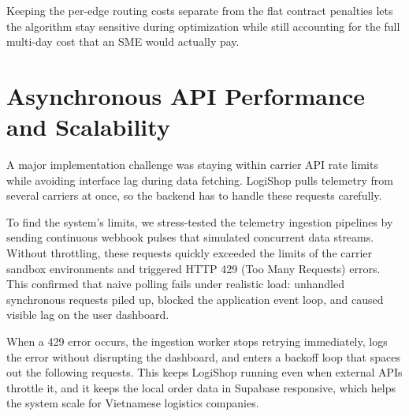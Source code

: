 Keeping the per-edge routing costs separate from the flat contract penalties lets the algorithm stay sensitive during optimization while still accounting for the full multi-day cost that an SME would actually pay.

\section{Asynchronous API Performance and Scalability}

A major implementation challenge was staying within carrier API rate limits while avoiding interface lag during data fetching. LogiShop pulls telemetry from several carriers at once, so the backend has to handle these requests carefully.

To find the system's limits, we stress-tested the telemetry ingestion pipelines by sending continuous webhook pulses that simulated concurrent data streams. Without throttling, these requests quickly exceeded the limits of the carrier sandbox environments and triggered HTTP 429 (Too Many Requests) errors. This confirmed that naive polling fails under realistic load: unhandled synchronous requests piled up, blocked the application event loop, and caused visible lag on the user dashboard.

When a 429 error occurs, the ingestion worker stops retrying immediately, logs the error without disrupting the dashboard, and enters a backoff loop that spaces out the following requests. This keeps LogiShop running even when external APIs throttle it, and it keeps the local order data in Supabase responsive, which helps the system scale for Vietnamese logistics companies.